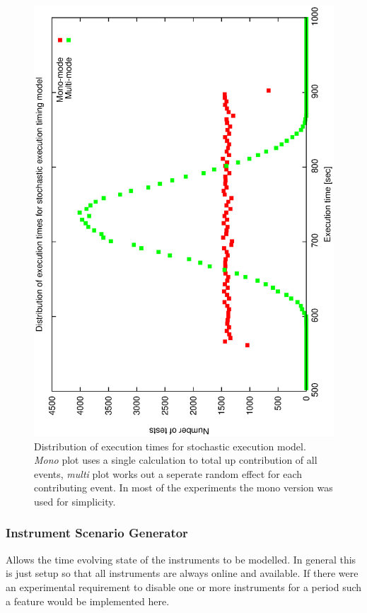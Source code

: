 \begin{figure}[h]
\begin{center}
  \includegraphics[scale=0.5, angle=-90]{figures/simf_exec_plot.eps}
\caption[Distribution of execution times for stochastic execution model]
{Distribution of execution times for stochastic execution model. \emph{Mono} plot uses a single calculation to total up contribution of all events, \emph{multi} plot works out a seperate random effect for each contributing event. In most of the experiments the mono version was used for simplicity.}
 \label{fig:simf_exec_timing_dist}
\end{center}
\end{figure}

\subsubsection{Instrument Scenario Generator}
\label{sect:sub_isg}
Allows the time evolving state of the instruments to be modelled. In general this is just setup so that all instruments are always online and available. If there were an experimental requirement to disable one or more instruments for a period such a feature would be implemented here.

